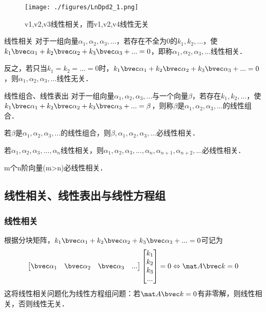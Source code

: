 

\begin{figure}[ht]
\centering
\texttt{[image: ./figures/LnDpd2\_1.png]}
\caption{v1,v2,v3线性相关，而v1,v2,v4线性无关} \label{LnDpd2_fig1}
\end{figure}

\begin{definition}{线性相关}
对于一组向量$\alpha_1, \alpha_2,\alpha_3,...$，若存在不全为0的$k_1,k_2,...$，使$k_1 \bvec \alpha_1+k_2 \bvec \alpha_2+k_3 \bvec \alpha_3+...=0$，即称$\alpha_1, \alpha_2,\alpha_3,...$线性相关．

反之，若只当$k_1=k_2=...=0$时，$k_1 \bvec \alpha_1+k_2 \bvec \alpha_2+k_3 \bvec \alpha_3+...=0$，则$\alpha_1, \alpha_2,\alpha_3,...$线性无关．
\end{definition}

\begin{definition}{线性组合、线性表出}
对于一组向量$\alpha_1, \alpha_2,\alpha_3,...$与一个向量$\beta$，若存在$k_1,k_2,...$，使$k_1 \bvec \alpha_1+k_2 \bvec \alpha_2+k_3 \bvec \alpha_3+...=\beta$，则称$\beta$是$\alpha_1, \alpha_2,\alpha_3,...$的线性组合．
\end{definition}

\begin{theorem}{}
若$\beta$是$\alpha_1, \alpha_2,\alpha_3,...$的线性组合，则$\beta, \alpha_1, \alpha_2,\alpha_3,...$必线性相关．
\end{theorem}

\begin{theorem}{}
若$\alpha_1, \alpha_2,\alpha_3,...,\alpha_n$线性相关，则$\alpha_1, \alpha_2,\alpha_3,...,\alpha_n,\alpha_{n+1},\alpha_{n+2},...$必线性相关．
\end{theorem}

\begin{theorem}{}
m个n阶向量(m>n)必线性相关．
\end{theorem}

\subsection{线性相关、线性表出与线性方程组}
\subsubsection{线性相关}
根据分块矩阵，$k_1 \bvec \alpha_1+k_2 \bvec \alpha_2+k_3 \bvec \alpha_3+...=0$可记为
$$
\begin{bmatrix}
\bvec \alpha_1& \bvec \alpha_2& \bvec \alpha_3&...
\end{bmatrix}
\begin{bmatrix}
k_{1}\\
k_{2}\\
k_{3}\\
...\\
\end{bmatrix}
=
0
\Leftrightarrow 
\mat A \bvec k = 0
$$
这将线性相关问题化为线性方程组问题：若$\mat A \bvec k = 0$有非零解，则线性相关，否则线性无关．
